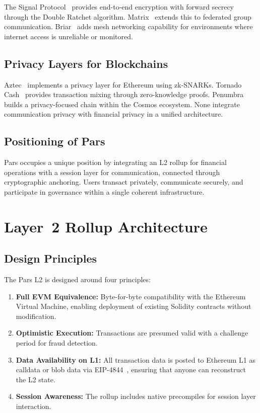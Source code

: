 \documentclass[11pt,a4paper]{article}
\begin{document}
The Signal Protocol~\cite{marlinspike2016signal} provides end-to-end
encryption with forward secrecy through the Double Ratchet algorithm.
Matrix~\cite{hodgson2019matrix} extends this to federated group
communication.  Briar~\cite{briar2017} adds mesh networking capability for
environments where internet access is unreliable or monitored.

\subsection{Privacy Layers for Blockchains}

Aztec~\cite{williamson2018aztec} implements a privacy layer for Ethereum
using zk-SNARKs.  Tornado Cash~\cite{pertsev2019tornado} provides
transaction mixing through zero-knowledge proofs.
Penumbra~\cite{penumbra2022} builds a privacy-focused chain within the
Cosmos ecosystem.  None integrate communication privacy with financial
privacy in a unified architecture.

\subsection{Positioning of Pars}

Pars occupies a unique position by integrating an L2 rollup for financial
operations with a session layer for communication, connected through
cryptographic anchoring.  Users transact privately, communicate securely,
and participate in governance within a single coherent infrastructure.

\section{Layer~2 Rollup Architecture}
\label{sec:l2design}

\subsection{Design Principles}

The Pars L2 is designed around four principles:

\begin{enumerate}
    \item \textbf{Full EVM Equivalence:} Byte-for-byte compatibility with
    the Ethereum Virtual Machine, enabling deployment of existing Solidity
    contracts without modification.

    \item \textbf{Optimistic Execution:} Transactions are presumed valid
    with a challenge period for fraud detection.

    \item \textbf{Data Availability on L1:} All transaction data is posted
    to Ethereum L1 as calldata or blob data via
    EIP-4844~\cite{eip4844}, ensuring that anyone can reconstruct the L2
    state.

    \item \textbf{Session Awareness:} The rollup includes native precompiles
    for session layer interaction.
\end{enumerate}
\end{document}
